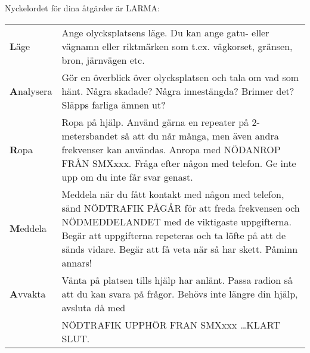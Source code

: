 Nyckelordet för dina åtgärder är LARMA:

\begin{tabular}{lp{9cm}}
	\textbf{L}äge &
        Ange olycksplatsens läge.
        Du kan ange gatu- eller vägnamn eller riktmärken som
        t.ex. vägkorset, gränsen, bron, järnvägen etc.
	\\
	\textbf{A}nalysera
	&
        Gör en överblick över olycksplatsen och tala om vad som hänt.
        Några skadade? Några innestängda?
        Brinner det? Släpps farliga ämnen ut?
	\\
	\textbf{R}opa &
        Ropa på hjälp.
        Använd gärna en repeater på 2-metersbandet så att du når många,
        men även andra frekvenser kan användas.
        Anropa med NÖDANROP FRÅN SMXxxx.
        Fråga efter någon med telefon.
        Ge inte upp om du inte får svar genast.
	\\
	\textbf{M}eddela &
        Meddela när du fått kontakt med någon med telefon, sänd NÖDTRAFIK PÅGÅR
        för att freda frekvensen och NÖDMEDDELANDET med de viktigaste
        uppgifterna.
        Begär att uppgifterna repeteras och ta löfte på att de sänds vidare.
        Begär att få veta när så har skett.
        Påminn annars!
	\\
	\textbf{A}vvakta &
        Vänta på platsen tills hjälp har anlänt.
        Passa radion så att du kan svara på frågor.
        Behövs inte längre din hjälp, avsluta då med\\
	& NÖDTRAFIK UPPHÖR FRAN SMXxxx \dots KLART SLUT.
\end{tabular}

